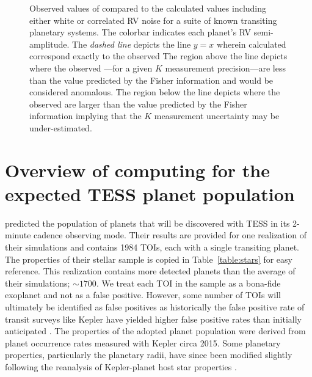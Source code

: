 \begin{figure}
  \centering
  \caption{Observed values of \nrv{} compared to the calculated 
    values including either white or correlated RV noise for a suite of known transiting planetary systems.
    The colorbar indicates each planet's RV semi-amplitude. The \emph{dashed line}
    depicts the line $y=x$ wherein calculated \nrv{} correspond exactly to the observed  The region
    above the line depicts where the observed \nrv{}---for a given $K$ measurement
    precision---are less than the value predicted by the Fisher information and would be considered anomalous.
    The region below the line depicts where the observed \nrv{} are larger than the value predicted by the
    Fisher information implying that the $K$ measurement uncertainty may be under-estimated.}
  \label{fig:compare}
\end{figure}

\section{Overview of computing \nrv{} for the expected TESS planet population} \label{sect:simulation}
 predicted the population of planets that will be discovered with TESS in its
2-minute cadence observing mode. Their results are provided for one realization of their simulations
and contains 1984 TOIs, each with a single transiting planet. The properties of their stellar sample
is copied in Table~\ref{table:stars} for easy reference. This realization contains more detected
planets than the average of their simulations; $\sim 1700$. We treat each TOI in the 
sample as a bona-fide exoplanet and not as a false positive. However, some number of TOIs will ultimately
be identified as false positives as historically the false positive rate of transit surveys like Kepler
have yielded higher false positive rates than initially anticipated \citep{sliski14,morton16}.
The properties of the adopted planet population
were derived from planet occurrence rates measured with Kepler circa 2015. Some planetary properties,
particularly the planetary radii, have since been modified slightly following
the reanalysis of Kepler-planet host star properties \citep[e.g.][]{fulton17}.

